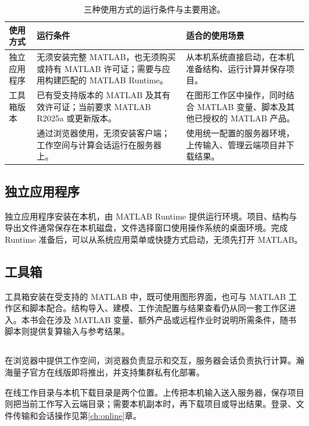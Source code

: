\begin{table}[!htb]
\centering
\caption{三种使用方式的运行条件与主要用途。}
\label{tab:usage-modes}
\begin{tabularx}{\linewidth}{>{\RaggedRight\arraybackslash}p{28mm}>{\RaggedRight\arraybackslash}X>{\RaggedRight\arraybackslash}X}
\toprule
使用方式 & 运行条件 & 适合的使用场景 \\
\midrule
独立应用程序 & 无须安装完整 MATLAB\regmark{}，也无须购买或持有 MATLAB\regmark{} 许可证；需要与应用构建匹配的 MATLAB\regmark{} Runtime。 & 从本机系统直接启动，在本机准备结构、运行计算并保存项目。 \\
工具箱版本 & 已有受支持版本的 MATLAB\regmark{} 及其有效许可证；当前要求 MATLAB\regmark{} R2025a 或更新版本。 & 在图形工作区中操作，同时结合 MATLAB\regmark{} 变量、脚本及其他已授权的 MATLAB\regmark{} 产品。 \\
\ksonline{} & 通过浏览器使用，无须安装客户端；工作空间与计算会话运行在服务器上。 & 使用统一配置的服务器环境，上传输入、管理云端项目并下载结果。 \\
\bottomrule
\end{tabularx}
\end{table}

\subsection{独立应用程序}
独立应用程序安装在本机，由 MATLAB\regmark{} Runtime 提供运行环境。项目、结构与导出文件通常保存在本机磁盘，文件选择窗口使用操作系统的桌面环境。完成 Runtime 准备后，可以从系统应用菜单或快捷方式启动，无须先打开 MATLAB\regmark{}。

\subsection{\regmark{} 工具箱}
工具箱安装在受支持的 MATLAB\regmark{} 中，既可使用图形界面，也可与 MATLAB\regmark{} 工作区和脚本配合。结构导入、建模、工作流配置与结果查看仍从同一套工作区进入。本书会在涉及 MATLAB\regmark{} 变量、额外产品或远程作业时说明所需条件，随书脚本则提供复算输入与参考结果。

\subsection{\headinglatin{\ksonline}}
\ksonline{} 在浏览器中提供工作空间，浏览器负责显示和交互，服务器会话负责执行计算。瀚海量子\regmark{}官方在线版即将推出，并支持集群私有化部署。

在线工作目录与本机下载目录是两个位置。上传把本机输入送入服务器，保存项目则把当前工作写入云端目录；需要本机副本时，再下载项目或导出结果。登录、文件传输和会话操作见第\ref{ch:online}章。

